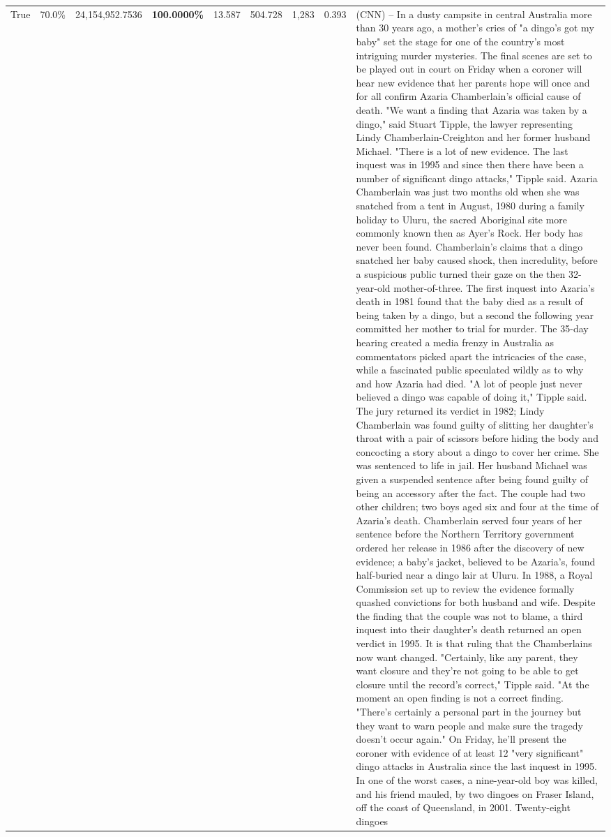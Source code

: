 \begin{table}[H]
\begin{tabular}{lllrlllll}
True & 70.0\% & 24,154,952.7536 & \bfseries \color{red} 100.0000\% & 13.587 & 504.728 & 1,283 & 0.393 & (CNN) -- In a dusty campsite in central Australia more than 30 years ago, a mother's cries of "a dingo's got my baby" set the stage for one of the country's most intriguing murder mysteries. The final scenes are set to be played out in court on Friday when a coroner will hear new evidence that her parents hope will once and for all confirm Azaria Chamberlain's official cause of death. "We want a finding that Azaria was taken by a dingo," said Stuart Tipple, the lawyer representing Lindy Chamberlain-Creighton and her former husband Michael. "There is a lot of new evidence. The last inquest was in 1995 and since then there have been a number of significant dingo attacks," Tipple said. Azaria Chamberlain was just two months old when she was snatched from a tent in August, 1980 during a family holiday to Uluru, the sacred Aboriginal site more commonly known then as Ayer's Rock. Her body has never been found. Chamberlain's claims that a dingo snatched her baby caused shock, then incredulity, before a suspicious public turned their gaze on the then 32-year-old mother-of-three. The first inquest into Azaria's death in 1981 found that the baby died as a result of being taken by a dingo, but a second the following year committed her mother to trial for murder. The 35-day hearing created a media frenzy in Australia as commentators picked apart the intricacies of the case, while a fascinated public speculated wildly as to why and how Azaria had died. "A lot of people just never believed a dingo was capable of doing it," Tipple said. The jury returned its verdict in 1982; Lindy Chamberlain was found guilty of slitting her daughter's throat with a pair of scissors before hiding the body and concocting a story about a dingo to cover her crime. She was sentenced to life in jail. Her husband Michael was given a suspended sentence after being found guilty of being an accessory after the fact. The couple had two other children; two boys aged six and four at the time of Azaria's death. Chamberlain served four years of her sentence before the Northern Territory government ordered her release in 1986 after the discovery of new evidence; a baby's jacket, believed to be Azaria's, found half-buried near a dingo lair at Uluru. In 1988, a Royal Commission set up to review the evidence formally quashed convictions for both husband and wife. Despite the finding that the couple was not to blame, a third inquest into their daughter's death returned an open verdict in 1995. It is that ruling that the Chamberlains now want changed. "Certainly, like any parent, they want closure and they're not going to be able to get closure until the record's correct," Tipple said. "At the moment an open finding is not a correct finding. "There's certainly a personal part in the journey but they want to warn people and make sure the tragedy doesn't occur again." On Friday, he'll present the coroner with evidence of at least 12 "very significant" dingo attacks in Australia since the last inquest in 1995. In one of the worst cases, a nine-year-old boy was killed, and his friend mauled, by two dingoes on Fraser Island, off the coast of Queensland, in 2001. Twenty-eight dingoes 
\end{tabular}
\end{table}
